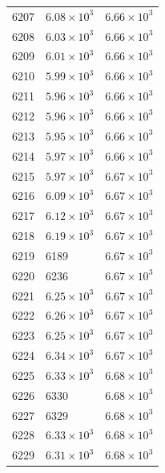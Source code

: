 \begin{table}[H]
\begin{tabular}{lll}
6207 & $\displaystyle 6.08 \times 10^{3}$ & $\displaystyle 6.66 \times 10^{3}$ \\
6208 & $\displaystyle 6.03 \times 10^{3}$ & $\displaystyle 6.66 \times 10^{3}$ \\
6209 & $\displaystyle 6.01 \times 10^{3}$ & $\displaystyle 6.66 \times 10^{3}$ \\
6210 & $\displaystyle 5.99 \times 10^{3}$ & $\displaystyle 6.66 \times 10^{3}$ \\
6211 & $\displaystyle 5.96 \times 10^{3}$ & $\displaystyle 6.66 \times 10^{3}$ \\
6212 & $\displaystyle 5.96 \times 10^{3}$ & $\displaystyle 6.66 \times 10^{3}$ \\
6213 & $\displaystyle 5.95 \times 10^{3}$ & $\displaystyle 6.66 \times 10^{3}$ \\
6214 & $\displaystyle 5.97 \times 10^{3}$ & $\displaystyle 6.66 \times 10^{3}$ \\
6215 & $\displaystyle 5.97 \times 10^{3}$ & $\displaystyle 6.67 \times 10^{3}$ \\
6216 & $\displaystyle 6.09 \times 10^{3}$ & $\displaystyle 6.67 \times 10^{3}$ \\
6217 & $\displaystyle 6.12 \times 10^{3}$ & $\displaystyle 6.67 \times 10^{3}$ \\
6218 & $\displaystyle 6.19 \times 10^{3}$ & $\displaystyle 6.67 \times 10^{3}$ \\
6219 & 6189 & $\displaystyle 6.67 \times 10^{3}$ \\
6220 & 6236 & $\displaystyle 6.67 \times 10^{3}$ \\
6221 & $\displaystyle 6.25 \times 10^{3}$ & $\displaystyle 6.67 \times 10^{3}$ \\
6222 & $\displaystyle 6.26 \times 10^{3}$ & $\displaystyle 6.67 \times 10^{3}$ \\
6223 & $\displaystyle 6.25 \times 10^{3}$ & $\displaystyle 6.67 \times 10^{3}$ \\
6224 & $\displaystyle 6.34 \times 10^{3}$ & $\displaystyle 6.67 \times 10^{3}$ \\
6225 & $\displaystyle 6.33 \times 10^{3}$ & $\displaystyle 6.68 \times 10^{3}$ \\
6226 & 6330 & $\displaystyle 6.68 \times 10^{3}$ \\
6227 & 6329 & $\displaystyle 6.68 \times 10^{3}$ \\
6228 & $\displaystyle 6.33 \times 10^{3}$ & $\displaystyle 6.68 \times 10^{3}$ \\
6229 & $\displaystyle 6.31 \times 10^{3}$ & $\displaystyle 6.68 \times 10^{3}$ \\

\end{tabular}
\end{table}
